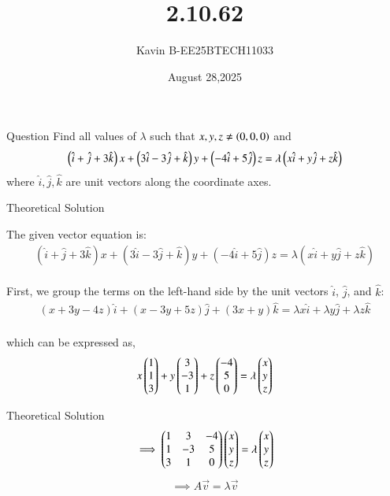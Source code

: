 \documentclass{beamer}
\begin{document}
\title 
{2.10.62}
\date{August 28,2025}


\author 
{Kavin B-EE25BTECH11033}






\frame{\titlepage}
\begin{frame}{Question}
Find all values of $\lambda$ such that $x,y,z\neq\left(0,0,0\right)$ and $$\left(\hat{i}+\hat{j}+3\hat{k}\right)x+\left(3\hat{i}-3\hat{j}+\hat{k}\right)y+\left(-4\hat{i}+5\hat{j}\right)z=\lambda\left(x\hat{i}+y\hat{j}+z\hat{k}\right)$$ where $\hat{i}, \hat{j}, \hat{k}$ are unit vectors along the coordinate axes.
\end{frame}



\begin{frame}{Theoretical Solution}

The given vector equation is:
\begin{align}
(\hat{i} + \hat{j} + 3\hat{k})x + (3\hat{i} - 3\hat{j} + \hat{k})y + (-4\hat{i} + 5\hat{j})z = \lambda(x\hat{i} + y\hat{j} + z\hat{k})
\end{align}\\

First, we group the terms on the left-hand side by the unit vectors $\hat{i}$, $\hat{j}$, and $\hat{k}$:
\begin{align}
    (x + 3y - 4z)\hat{i} + (x - 3y + 5z)\hat{j} + (3x + y)\hat{k} = \lambda x\hat{i} + \lambda y\hat{j} + \lambda z\hat{k}
\end{align}\\
which can be expressed as,
\begin{align}
x\begin{pmatrix}1\\1\\3\end{pmatrix} + y\begin{pmatrix}3\\-3\\1\end{pmatrix} + z\begin{pmatrix}-4\\5\\0\end{pmatrix} = \lambda\begin{pmatrix}x\\y\\z\end{pmatrix}
\end{align}

\end{frame}

\begin{frame}{Theoretical Solution}
\begin{align}
\implies\begin{myvec}{1 & 3 & -4 \\ 1 & -3 & 5 \\ 3 & 1 & 0}\end{myvec}\begin{myvec}{x \\ y \\ z}\end{myvec} = \lambda\begin{myvec}{x \\ y \\ z}\end{myvec}
\end{align}
\begin{align}
\implies A\vec{v} = \lambda\vec{v}
\end{align}

\end{frame}
\end{document}
